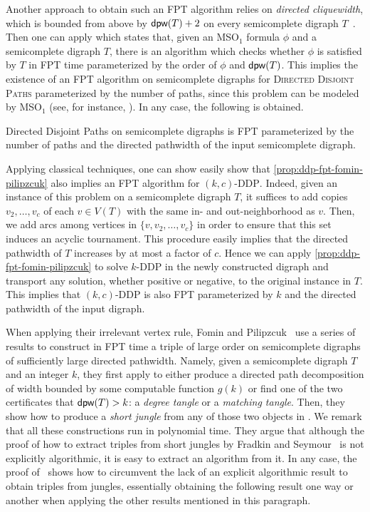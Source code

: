 \documentclass[a4paper,UKenglish,cleveref, autoref, thm-restate]{lipics-v2021}
\DeclareMathOperator{\dpw}{\text{\sf dpw}\xspace}
\renewcommand{\FPT}{{\sf FPT}\xspace}
\begin{document}
Another approach to obtain such an \FPT algorithm relies on \emph{directed cliquewidth}, which is bounded from above by $\dpw(T) + 2$ on every semicomplete digraph $T$~\cite[Lemma 2.14]{FominP19}.
Then one can apply \cite[Theorem 2.16]{FominP19} which states that, given an MSO$_1$ formula $\phi$ and a semicomplete digraph $T$, there is an algorithm  which checks whether $\phi$ is satisfied by $T$ in \FPT time parameterized by the order of $\phi$ and $\dpw(T)$.
This implies the existence of an \FPT algorithm on semicomplete digraphs for \textsc{Directed Disjoint Paths} parameterized by the number of paths, since this problem can be modeled by MSO$_1$ (see, for instance, \cite[Proposition 4.7]{GANIAN201488}).
In any case, the following is obtained.

\begin{proposition}\label{prop:ddp-fpt-fomin-pilipzcuk}
{\sc Directed Disjoint Paths} on semicomplete digraphs is \FPT parameterized by the number of paths and the directed pathwidth of the input semicomplete digraph.
\end{proposition}

Applying classical techniques, one can show easily show that \autoref{prop:ddp-fpt-fomin-pilipzcuk} also implies an \FPT algorithm for $(k,c)$-\textsc{DDP}.
Indeed, given an instance of this problem on a semicomplete digraph $T$, it suffices to add copies $v_2, \ldots, v_c$ of each $v \in V(T)$ with the same in- and out-neighborhood as $v$. 
Then, we add arcs among vertices in $\{v, v_2, \ldots, v_c\}$ in order to ensure that this set induces an acyclic tournament.
This procedure easily implies that the directed pathwidth of $T$ increases by at most a factor of $c$. Hence we can apply \autoref{prop:ddp-fpt-fomin-pilipzcuk} to solve $k$-\textsc{DDP} in the newly constructed digraph and transport any solution, whether positive or negative, to the original instance in $T$.
This implies that $(k,c)$-\textsc{DDP} is also \FPT parameterized by $k$ and the directed pathwidth of the input digraph.

When applying their irrelevant vertex rule, Fomin and Pilipzcuk~\cite{FominP19} use a series of results to construct in \FPT time a triple of large order on semicomplete digraphs of sufficiently large directed pathwidth.
Namely, given a semicomplete digraph $T$ and an integer $k$, they first apply \cite[Theorem 4.12]{FominP19} to either produce a directed path decomposition of width bounded by some computable function $g(k)$ or find one of the two certificates that $\dpw(T) > k$: a \emph{degree tangle} or a \emph{matching tangle}.
Then, they show how to produce a \emph{short jungle} from any of those two objects in \cite[Lemmas 3.9 and 3.12]{FominP19}.
We remark that all these constructions run in polynomial time.
They argue that although the proof of how to extract triples from short jungles by Fradkin and Seymour~\cite{FradkinS13} is not explicitly algorithmic, it is easy to extract an algorithm from it.
In any case,  the proof of~\cite[Theorem 9.9]{FominP19} shows how to circumvent the lack of an explicit algorithmic result to obtain triples from jungles, essentially obtaining the following result one way or another when applying the other results mentioned in this paragraph.
\end{document}
